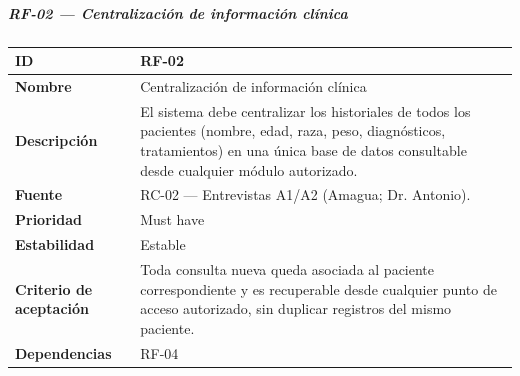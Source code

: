 \documentclass[
]{article}
\newcounter{none} %
\begin{document}
\subparagraph{RF-02 --- Centralización de información
clínica}\label{rf-02-centralizaciuxf3n-de-informaciuxf3n-cluxednica}

{\def\LTcaptype{none} %
\begin{longtable}[]{@{}
  >{\raggedright\arraybackslash}p{}
  >{\raggedright\arraybackslash}p{}@{}}
\toprule\noalign{}
\begin{minipage}[b]{\linewidth}\raggedright
\textbf{ID}
\end{minipage} & \begin{minipage}[b]{\linewidth}\raggedright
RF-02
\end{minipage} \\
\midrule\noalign{}
\endhead
\bottomrule\noalign{}
\endlastfoot
\textbf{Nombre} & \begin{minipage}[t]{\linewidth}\raggedright
Centralización de información clínica
\end{minipage} \\
\textbf{Descripción} & \begin{minipage}[t]{\linewidth}\raggedright
El sistema debe centralizar los historiales de todos los pacientes
(nombre, edad, raza, peso, diagnósticos, tratamientos) en una única base de datos consultable
desde cualquier módulo autorizado.
\end{minipage} \\
\textbf{Fuente} & \begin{minipage}[t]{\linewidth}\raggedright
RC-02 --- Entrevistas A1/A2 (Amagua; Dr. Antonio).
\end{minipage} \\
\textbf{Prioridad} & \begin{minipage}[t]{\linewidth}\raggedright
Must have
\end{minipage} \\
\textbf{Estabilidad} & \begin{minipage}[t]{\linewidth}\raggedright
Estable
\end{minipage} \\
\textbf{Criterio de aceptación} &
\begin{minipage}[t]{\linewidth}\raggedright
Toda consulta nueva queda asociada al paciente correspondiente y es
recuperable desde cualquier punto de acceso autorizado, sin duplicar
registros del mismo paciente.
\end{minipage} \\
\textbf{Dependencias} & \begin{minipage}[t]{\linewidth}\raggedright
RF-04
\end{minipage} \\
\end{longtable}
}
\end{document}
